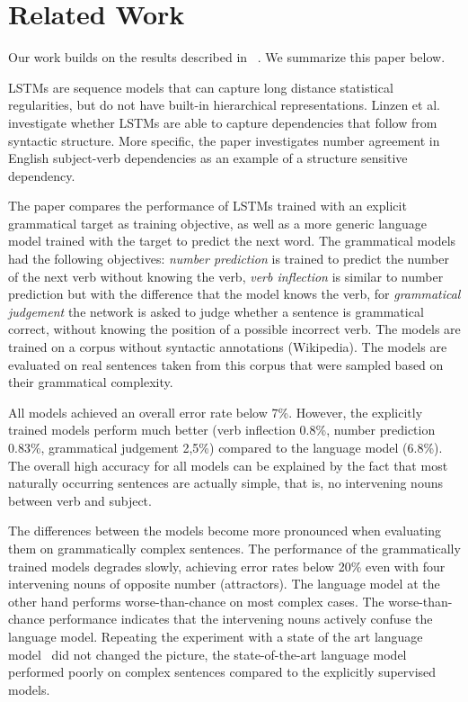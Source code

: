 \section{Related Work}
\label{related work}

Our work builds on the results described in ~\citep{Linzen2016}.  
We summarize this paper below.

LSTMs are sequence models that can capture long distance statistical regularities,
but do not have built-in hierarchical representations.
Linzen et al. investigate whether LSTMs are able to capture
dependencies that follow from syntactic structure. More specific,
the paper investigates number agreement in English subject-verb dependencies
as an example of a structure sensitive dependency.

The paper compares the performance of LSTMs
trained with an explicit grammatical target as training objective,
as well as a more generic language model trained with the target to
predict the next word. 
The grammatical models had the following objectives:
\textit{number prediction} is trained to predict the 
number of the next verb without knowing the verb,
\textit{verb inflection} is similar to number prediction
but with the difference that the model knows the verb,
for \textit{grammatical judgement} the network is asked
to judge whether a sentence is grammatical correct, 
without knowing the position of a possible incorrect
verb.
The models are trained on a corpus without syntactic annotations (Wikipedia).
The models are evaluated on real sentences taken from this corpus
that were sampled based on their grammatical complexity. 
  
All models achieved an overall error rate below 7\%. However,
the explicitly trained models perform much better 
(verb inflection 0.8\%, number prediction 0.83\%, grammatical judgement 2,5\%)
compared to the language model (6.8\%). 
The overall high accuracy for all models can be explained by
the fact that most naturally occurring sentences are actually
simple, that is, no intervening nouns between verb and subject.

The differences between the models become more pronounced
when evaluating them on grammatically complex sentences.
The performance of the grammatically trained models
degrades slowly, achieving error rates below 20\% even with
four intervening nouns of opposite number (attractors).
The language model at the other hand performs worse-than-chance
on most complex cases. The worse-than-chance performance
indicates that the intervening nouns actively confuse
the language model. Repeating the experiment with a
state of the art language model~\citep{Jozefowicz2016} did not
changed the picture, the state-of-the-art language model 
performed poorly on complex sentences 
compared to the explicitly supervised models.


